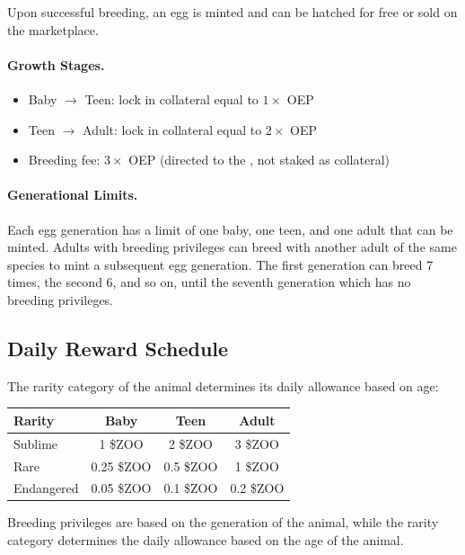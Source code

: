 Upon successful breeding, an egg is minted and can be hatched for free or sold on the marketplace.

\paragraph{Growth Stages.}
\begin{itemize}[nosep]
\item Baby $\to$ Teen: lock in collateral equal to $1\times$ OEP
\item Teen $\to$ Adult: lock in collateral equal to $2\times$ OEP
\item Breeding fee: $3\times$ OEP (directed to the \DAO{}, not staked as collateral)
\end{itemize}

\paragraph{Generational Limits.}
Each egg generation has a limit of one baby, one teen, and one adult that can be minted. Adults with breeding privileges can breed with another adult of the same species to mint a subsequent egg generation. The first generation can breed 7 times, the second 6, and so on, until the seventh generation which has no breeding privileges.

\subsection{Daily Reward Schedule}

The rarity category of the animal determines its daily allowance based on age:

\begin{center}
\begin{tabular}{lccc}
\toprule
\textbf{Rarity} & \textbf{Baby} & \textbf{Teen} & \textbf{Adult} \\
\midrule
Sublime    & 1 \$ZOO    & 2 \$ZOO    & 3 \$ZOO \\
Rare       & 0.25 \$ZOO & 0.5 \$ZOO  & 1 \$ZOO \\
Endangered & 0.05 \$ZOO & 0.1 \$ZOO  & 0.2 \$ZOO \\
\bottomrule
\end{tabular}
\end{center}

\noindent Breeding privileges are based on the generation of the animal, while the rarity category determines the daily allowance based on the age of the animal.
